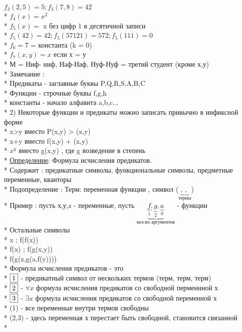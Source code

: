 \documentclass{article}
\begin{document}
$f_3(2,5) = 5 ; f_3(7,8) = 42$ \\*
$f_4(x) = x^2$ \\*
$f_5(x) = $ x без цифр 1 в десятичной записи \\*
$f_5(42) = 42 ; f_5(57121) = 572 ; f_5(111) = 0$ \\*
$f_6 = 7$ = константа (k = 0) \\*
$f_7(x,y) = x $ если х = у \\*
М = {Ниф- ниф, Наф-Наф, Нуф-Нуф} = третий студент (кроме х,у) \\*
Замечание : \\*
Предикаты - заглавные буквы P,Q,R,S,A,B,C \\*
Функции - строчные буквы f,g,h \\*
константы - начало алфавита a,b,c... \\*
2) Некоторые функции и предикаты можно записать привычно в инфиксной форме \\*
x>y вместо P(x,y) > (x,y) \\*
x+y вместо f(x,y) + (x,y) \\*
$x^y$ вместо g(x,y) ,  где g возведение в степень \\*
\underline{Определение}: Формула исчисления предикатов. \\*
Содержит : предикатные символы, функциональные символы, предметные переменные, кванторы \\*
Подопределение : 
Терм: переменная функции , символ ($\underbrace { \mbox{, , }}_{\mbox{термы}}$)\\*
Пример : пусть х,у,z - переменные, пусть $\underbrace{\underbrace{f}_{1},\underbrace{g}_{2},\underbrace{a}_{0}}_{\mbox{кол-во аргументов}}$ -  функции \\*
Остальные символы \\*
x  ; f(f(x)) \\*
f(x) ; f(g(x,y)) \\*
f(g(x,g(a,f(y)))) \\*
Формула исчисления предикатов - это \\*
$\fbox{1}$ - предикатный символ от нескольких термов (терм, терм, терм) \\*
$\fbox{2}$ - $\forall x$ формула исчисления предикатов со свободной перменнной х \\*
$\fbox{3}$ - $\exists x$ формула исчисления предикатов со свободной переменной х \\*
(1) - все переменные внутри термов свободны \\*
(2,3) - здесь переменная х перестает быть свободной, становится связанной \\*
\end{document}
